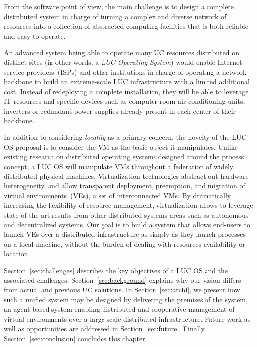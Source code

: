 From the software point of view, the main challenge is to design a complete distributed
system in charge of turning a complex and diverse network of resources into a collection
of abstracted computing facilities that is both reliable and easy to operate.

\begin{svgraybox}
An advanced system being able to operate 
many UC resources distributed on distinct sites (in other words, a \emph{LUC
  Operating System}) would enable%
Internet service providers~(ISPs) and other institutions in
charge of operating a network backbone to build an extreme-scale
LUC infrastructure with a limited additional cost. Instead of redeploying a
complete installation, they will be able to leverage IT resources and
specific devices such as computer room air conditioning units, inverters or
redundant power supplies already present in each center of their
backbone. 
\end{svgraybox}


\medskip

In addition to considering \emph{locality} as a primary concern, the novelty of the LUC OS
proposal is to consider the VM as the basic object it manipulates.  Unlike existing
research on distributed operating systems designed around the process concept, a LUC OS will manipulate VMs throughout a federation of widely distributed
physical machines. Virtualization technologies abstract out hardware heterogeneity, and allow
transparent deployment, preemption, and migration of virtual
environments~(VEs), \ie a set of interconnected VMs.
By dramatically increasing the flexibility of resource management, virtualization 
allows to leverage state-of-the-art results from other distributed
systems areas such as autonomous and decentralized systems.  
Our goal is to build a system that allows end-users to launch VEs over a
distributed infrastructure as simply as they launch processes on a
local machine, \ie  without the burden of dealing with resources
availability or location.

Section~\ref{sec:challenges} describes the key objectives of a LUC OS and the associated challenges. 
Section~\ref{sec:background} explains why our vision differs from actual and previous UC solutions. In
Section~\ref{sec:archi}, we present how such a unified system may be designed
by delivering the premises of the \discovery system, an agent-based system
enabling distributed and cooperative management of virtual environments over a
large-scale distributed infrastructure.
Future work as well as opportunities  are addressed in Section~\ref{sec:future}. Finally Section~\ref{sec:conclusion} concludes this chapter. 
